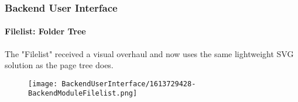 %

\begin{frame}[fragile]
	\frametitle{Backend User Interface}
	\framesubtitle{Filelist: Folder Tree}

	The "Filelist" received a visual overhaul and now uses the same lightweight
	SVG solution as the page tree does.

	\begin{figure}
		\texttt{[image: BackendUserInterface/1613729428-BackendModuleFilelist.png]}
	\end{figure}

\end{frame}

